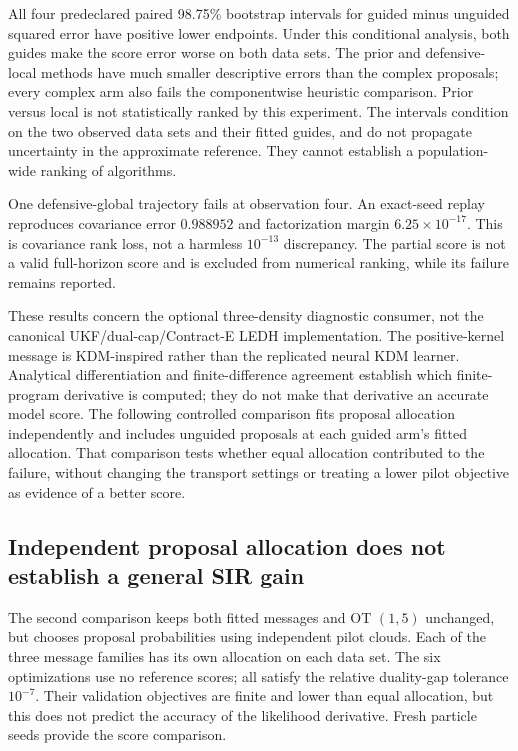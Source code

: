 All four predeclared paired 98.75\% bootstrap intervals for guided minus
unguided squared error have positive lower endpoints. Under this conditional
analysis, both guides make the score error worse on both data sets. The prior
and defensive-local methods have much smaller descriptive errors than the
complex proposals; every complex arm also fails the componentwise heuristic
comparison. Prior versus local is not statistically ranked by this experiment.
The intervals condition on the two observed data sets and their fitted guides,
and do not propagate uncertainty in the approximate reference. They cannot
establish a population-wide ranking of algorithms.

One defensive-global trajectory fails at observation four. An exact-seed
replay reproduces covariance error $0.988952$ and factorization margin
$6.25\times10^{-17}$. This is covariance rank loss, not a harmless
$10^{-13}$ discrepancy. The partial score is not a valid full-horizon score
and is excluded from numerical ranking, while its failure remains reported.

These results concern the optional three-density diagnostic consumer, not
the canonical UKF/dual-cap/Contract-E LEDH implementation. The positive-kernel
message is KDM-inspired rather than the replicated neural KDM learner.
Analytical differentiation and finite-difference agreement establish which
finite-program derivative is computed; they do not make that derivative an
accurate model score. The following controlled comparison fits proposal allocation
independently and includes unguided proposals at each guided arm's fitted
allocation. That comparison tests whether equal allocation contributed to the
failure, without changing the transport settings or treating a lower pilot
objective as evidence of a better score.

\subsection{Independent proposal allocation does not establish a general SIR gain}
\label{sec:bg-sir-calibrated-results}

The second comparison keeps both fitted messages and OT $(1,5)$ unchanged,
but chooses proposal probabilities using independent pilot clouds. Each of
the three message families has its own allocation on each data set. The
six optimizations use no reference scores; all satisfy the relative
duality-gap tolerance $10^{-7}$. Their validation objectives are finite and
lower than equal allocation, but this does not predict the accuracy of the
likelihood derivative. Fresh particle seeds provide the score comparison.

